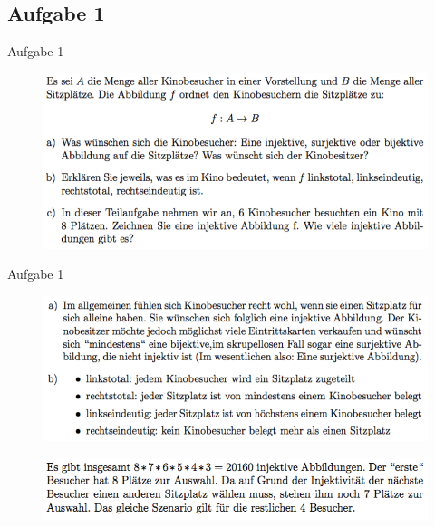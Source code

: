 \subsection{Aufgabe 1}
\begin{frame}{Aufgabe 1}
\begin{figure}[h!]
		\centering
		\includegraphics[width=\textwidth]{../topics/weihnachtstut-aufgaben/1.png} 
	\end{figure}     
\end{frame}

\begin{frame}{Aufgabe 1}
\begin{figure}[h!]
		\centering
		\includegraphics[width=\textwidth]{../topics/weihnachtstut-aufgaben/2.png} 
	\end{figure}  
	\begin{figure}[h!]
		\centering
		\includegraphics[width=\textwidth]{../topics/weihnachtstut-aufgaben/3.png} 
	\end{figure}   
\end{frame}


